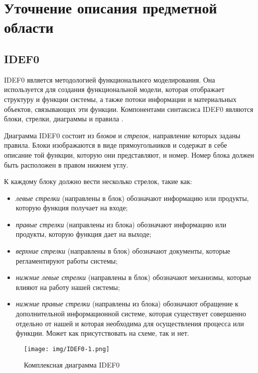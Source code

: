 \documentclass[14pt,russian]{extarticle}
\newcommand*\obj[1]{\textit{#1}}
\begin{document}
\clearpage
\section{Уточнение описания предметной области}

\subsection{IDEF0}

IDEF0 является методологией функционального моделирования. Она используется для
создания функциональной модели, которая отображает структуру и функции системы,
а также потоки информации и материальных объектов, связывающих эти функции.
Компонентами синтаксиса IDEF0 являются блоки, стрелки, диаграммы и правила
\cite{defense1}.

Диаграмма IDEF0 состоит из \obj{блоков} и \obj{стрелок}, направление которых
заданы правила. Блоки изображаются в виде прямоугольников и содержат в себе
описание той функции, которую они представляют, и номер. Номер блока должен быть
расположен в правом нижнем углу.

К каждому блоку должно вести несколько стрелок, такие как:

\begin{itemize}
	\item \obj{левые стрелки} (направлены в блок) обозначают информацию или
		продукты, которую функция получает на входе;

	\item \obj{правые стрелки} (направлены из блока) обозначают информацию
		или продукты, которую функция дает на выходе;

	\item \obj{верхние стрелки} (направлены в блок) обозначают документы,
		которые регламентируют работы системы;

	\item \obj{нижние левые стрелки} (направлены в блок) обозначают
		механизмы, которые влияют на работу нашей системы;

	\item \obj{нижние правые стрелки} (направлены из блока) обозначают
		обращение к дополнительной информационной системе, которая
		существует совершенно отдельно от нашей и которая необходима для
		осуществления процесса или функции. Может как присутствовать на
		схеме, так и нет.
\end{itemize}

\begin{figure}[H]
	\centering
	\texttt{[image: img/IDEF0-1.png]}
	\caption{Комплексная диаграмма IDEF0}
\end{figure}
\end{document}
